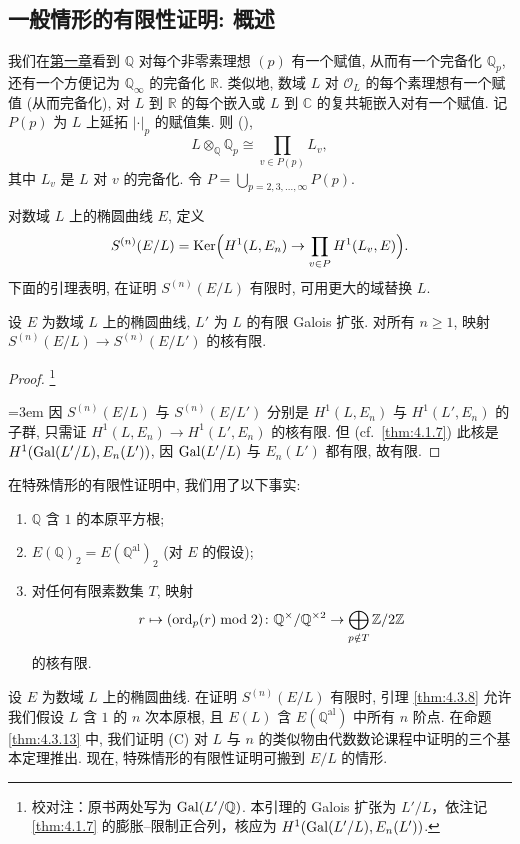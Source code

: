 \subsection*{一般情形的有限性证明: 概述}

我们在\hyperref[ch:1]{第一章}看到 $\mathbb{Q}$ 对每个非零素理想 $(p)$ 有一个赋值, 从而有一个完备化 $\mathbb{Q}_p$, 还有一个方便记为 $\mathbb{Q}_\infty$ 的完备化 $\mathbb{R}$. 类似地, 数域 $L$ 对 $\mathcal{O}_L$ 的每个素理想有一个赋值 (从而完备化), 对 $L$ 到 $\mathbb{R}$ 的每个嵌入或 $L$ 到 $\mathbb{C}$ 的复共轭嵌入对有一个赋值. 记 $P(p)$ 为 $L$ 上延拓 $|\cdot|_p$ 的赋值集. 则 (\cite[8.2]{milne-ant}),
\[
L\otimes_{\mathbb{Q}}\mathbb{Q}_p\cong\prod_{v\in P(p)}L_v,
\]
其中 $L_v$ 是 $L$ 对 $v$ 的完备化. 令 $P = \bigcup_{p = 2, 3, \dots, \infty}P(p)$.

对数域 $L$ 上的椭圆曲线 $E$, 定义
\[
S^{(n)}(E/L) = \operatorname{Ker}\Bigl(H^1(L, E_n)\to\prod_{v\in P}H^1(L_v, E)\Bigr).
\]
下面的引理表明, 在证明 $S^{(n)}(E/L)$ 有限时, 可用更大的域替换 $L$.

\begin{lemma} \label{thm:4.3.8} 
设 $E$ 为数域 $L$ 上的椭圆曲线, $L'$ 为 $L$ 的有限 Galois 扩张. 对所有 $n\ge 1$, 映射 $S^{(n)}(E/L)\to S^{(n)}(E/L')$ 的核有限.
\end{lemma}

\begin{proof}
\footnote{校对注：原书两处写为 $\operatorname{Gal}(L'/\mathbb{Q})$. 本引理的 Galois 扩张为 $L'/L$，依注记 \ref{thm:4.1.7} 的膨胀--限制正合列，核应为 $H^1(\operatorname{Gal}(L'/L),E_n(L'))$.}
{\emergencystretch=3em 因 $S^{(n)}(E/L)$ 与 $S^{(n)}(E/L')$ 分别是 $H^1(L, E_n)$ 与 $H^1(L', E_n)$ 的子群, 只需证 $H^1(L, E_n)\to H^1(L', E_n)$ 的核有限. 但 (cf.~\ref{thm:4.1.7}) 此核是 $H^1(\operatorname{Gal}(L'/L), E_n(L'))$, 因 $\operatorname{Gal}(L'/L)$ 与 $E_n(L')$ 都有限, 故有限.\par}
\end{proof}

在特殊情形的有限性证明中, 我们用了以下事实:
\begin{enumerate}[label=\textup{(\Alph*)}]
\item $\mathbb{Q}$ 含 $1$ 的本原平方根;
\item $E(\mathbb{Q})_2 = E(\mathbb{Q}^{\mathrm{al}})_2$ (对 $E$ 的假设);
\item 对任何有限素数集 $T$, 映射
\[
r\mapsto(\operatorname*{ord}\nolimits_p(r)\bmod 2)\colon\mathbb{Q}^{\times}/\mathbb{Q}^{\times2}\to\bigoplus_{p\notin T}\mathbb{Z}/2\mathbb{Z}
\]
的核有限.
\end{enumerate}
设 $E$ 为数域 $L$ 上的椭圆曲线. 在证明 $S^{(n)}(E/L)$ 有限时, 引理 \ref{thm:4.3.8} 允许我们假设 $L$ 含 $1$ 的 $n$ 次本原根, 且 $E(L)$ 含 $E(\mathbb{Q}^{\mathrm{al}})$ 中所有 $n$ 阶点. 在命题 \ref{thm:4.3.13} 中, 我们证明 (C) 对 $L$ 与 $n$ 的类似物由代数数论课程中证明的三个基本定理推出. 现在, 特殊情形的有限性证明可搬到 $E/L$ 的情形.

